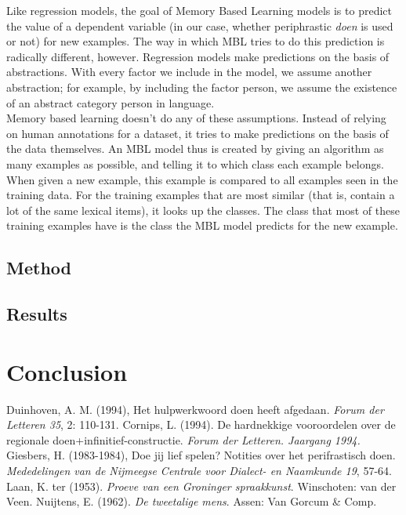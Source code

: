 \documentclass[12pt]{article}
\begin{document}
Like regression models, the goal of Memory Based Learning models is to predict the value of a dependent variable (in our case, whether periphrastic \emph{doen} is used or not) for new examples. The way in which MBL tries to do this prediction is radically different, however. Regression models make predictions on the basis of abstractions. With every factor we include in the model, we assume another abstraction; for example, by including the factor person, we assume the existence of an abstract category person in language.\\\indent
Memory based learning doesn't do any of these assumptions. Instead of relying on human annotations for a dataset, it tries to make predictions on the basis of the data themselves. An MBL model thus is created by giving an algorithm as many examples as possible, and telling it to which class each example belongs. When given a new example, this example is compared to all examples seen in the training data. For the training examples that are most similar (that is, contain a lot of the same lexical items), it looks up the classes. The class that most of these training examples have is the class the MBL model predicts for the new example.

\subsection{Method}

\subsection{Results}












\section{Conclusion} \label{conc}

\begin{thebibliography}{99}
Duinhoven, A. M. (1994), Het hulpwerkwoord doen heeft afgedaan. \emph{Forum der Letteren 35}, 2: 110-131.
Cornips, L. (1994). De hardnekkige vooroordelen over de regionale doen+infinitief-constructie. \emph{Forum der Letteren. Jaargang 1994.}
Giesbers, H. (1983-1984), Doe jij lief spelen? Notities over het perifrastisch doen. \emph{Mededelingen van de Nijmeegse Centrale voor Dialect- en Naamkunde 19}, 57-64.
Laan, K. ter (1953). \emph{Proeve van een Groninger spraakkunst}. Winschoten: van der Veen.
Nuijtens, E. (1962). \emph{De tweetalige mens}. Assen: Van Gorcum \& Comp.
\end{thebibliography}
\end{document}
